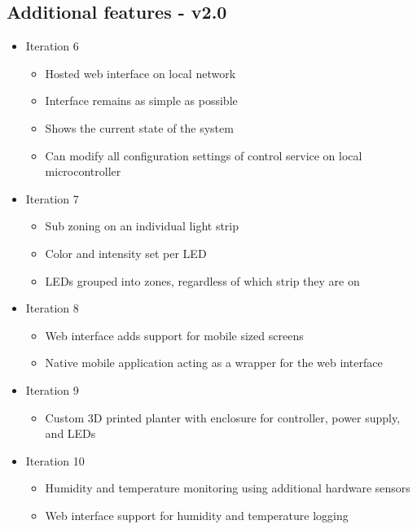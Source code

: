 \documentclass[onecolumn, draftclsnofoot,10pt, compsoc]{IEEEtran}
\begin{document}
		\subsection{Additional features - v2.0}
			\begin{itemize}
				\item Iteration 6
					\begin{itemize}
						\item Hosted web interface on local network
						\item Interface remains as simple as possible
						\item Shows the current state of the system
						\item Can modify all configuration settings of control service on local microcontroller
					\end{itemize}
				\item Iteration 7
					\begin{itemize}
						\item Sub zoning on an individual light strip
						\item Color and intensity set per LED
						\item LEDs grouped into zones, regardless of which strip they are on
					\end{itemize}
				\item Iteration 8
					\begin{itemize}
						\item Web interface adds support for mobile sized screens
						\item Native mobile application acting as a wrapper for the web interface
					\end{itemize}
				\item Iteration 9
					\begin{itemize}
						\item Custom 3D printed planter with enclosure for controller, power supply, and LEDs
					\end{itemize}
				\item Iteration 10
					\begin{itemize}
						\item Humidity and temperature monitoring using additional hardware sensors
						\item Web interface support for humidity and temperature logging
					\end{itemize}
			\end{itemize}
\end{document}
